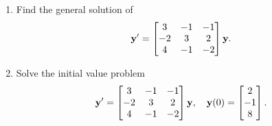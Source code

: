 \documentclass{ximera}
\begin{document}
\begin{example}\label{example:10.4.2}

\begin{enumerate}
\item\label{item:10.4.2a} %
 Find the general solution of
\begin{equation}\label{eq:10.4.12}
{\bf y}'=\begin{bmatrix}3&-1&-1\\-2&
3&
2\\4&-1&-2\end{bmatrix}{\bf y}.
\end{equation}

\item\label{item:10.4.2b}  %
 Solve the initial value problem
\begin{equation}\label{eq:10.4.13}
{\bf y}'=\begin{bmatrix}3&-1&-1\\-2&3&
2\\4&-1&-2\end{bmatrix}{\bf y},\quad{\bf y}(0)=\begin{bmatrix}2\\
-1\\8\end{bmatrix}.
\end{equation}
\end{enumerate}



\end{example}
\end{document}
